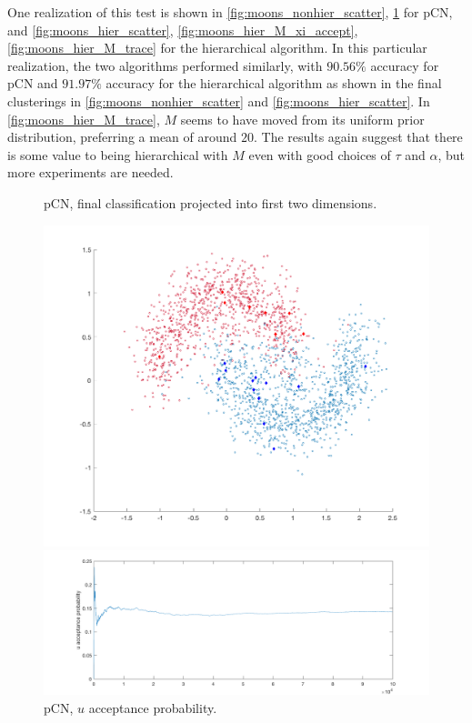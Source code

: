 \documentclass{siamart1116}
\begin{document}
            One realization of this test is shown in \cref{fig:moons_nonhier_scatter}, \cref{fig:moons_nonhier_u_accept} for pCN, and \cref{fig:moons_hier_scatter}, \cref{fig:moons_hier_M_xi_accept}, \cref{fig:moons_hier_M_trace} for the hierarchical algorithm.  In this particular realization, the two algorithms performed similarly, with $90.56\%$ accuracy for pCN and $91.97\%$ accuracy for the hierarchical algorithm as shown in the final clusterings in \cref{fig:moons_nonhier_scatter} and \cref{fig:moons_hier_scatter}. In \cref{fig:moons_hier_M_trace}, $M$ seems to have moved from its uniform prior distribution, preferring a mean of around $20$. The results again suggest that there is some value to being hierarchical with $M$ even with good choices of $\tau$ and $\alpha$, but more experiments are needed. 


            \begin{figure}[!htb]
            \begin{minipage}{0.48\textwidth}
                \centering
                \caption{\label{fig:moons_nonhier_scatter} pCN, final classification projected into first two dimensions.}
                \includegraphics[width=\linewidth]{learnM/moons/nonhier/sigma_0_20/scatter.png}
            \end{minipage} \hfill
            \begin{minipage}{0.48\textwidth}
                \centering
                \caption{\label{fig:moons_nonhier_u_accept} pCN, $u$ acceptance probability.}
                \includegraphics[width=\linewidth]{learnM/moons/nonhier/sigma_0_20/u_accept.png}
            \end{minipage}
            \end{figure}
\end{document}
